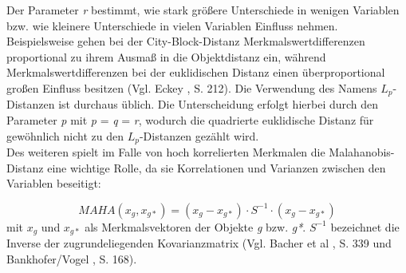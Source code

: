 Der Parameter \textit{r} bestimmt, wie stark größere Unterschiede in wenigen Variablen bzw. wie kleinere Unterschiede in vielen Variablen Einfluss nehmen. Beispielsweise gehen bei der City-Block-Distanz Merkmalswertdifferenzen proportional zu ihrem Ausmaß in die Objektdistanz ein, während Merkmalswertdifferenzen bei der euklidischen Distanz einen überproportional großen Einfluss besitzen (Vgl. Eckey \cite{Eckey.2002}, S. 212). Die Verwendung des Namens $L_p$-Distanzen ist durchaus üblich. Die Unterscheidung erfolgt hierbei durch den Parameter \textit{p} mit \textit{p} = \textit{q} = \textit{r}, wodurch die quadrierte euklidische Distanz für gewöhnlich nicht zu den $L_p$-Distanzen gezählt wird. \\

Des weiteren spielt im Falle von hoch korrelierten Merkmalen die Malahanobis-Distanz eine wichtige Rolle, da sie Korrelationen und Varianzen zwischen den Variablen beseitigt:

\begin{equation}
MAHA(x_{g},x_{g*}) = (x_{g} - x_{g*}) \cdot S^{-1} \cdot (x_{g} - x_{g*})
\end{equation}
mit $x_{g}$ und $x_{g*}$ als Merkmalsvektoren der Objekte \textit{g} bzw. \textit{g*}. $S^{-1}$ bezeichnet die Inverse der zugrundeliegenden Kovarianzmatrix (Vgl. Bacher et al \cite{Bacher.2010}, S. 339 und Bankhofer/Vogel \cite{Bankhofer.2008}, S. 168).